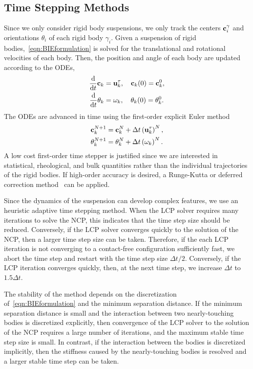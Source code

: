 \documentclass[preprint, 10pt]{elsarticle}
\begin{document}
\subsection{Time Stepping Methods}
\label{sec:temporal}
Since we only consider rigid body suspensions, we only track the centers
${\mathbf{c}}_i^\gamma$ and orientations $\theta_i$ of each rigid body
$\gamma_i$. Given a suspension of rigid
bodies,~\eqref{eqn:BIEformulation} is solved for the translational and
rotational velocities of each body. Then, the position and angle of each
body are updated according to the ODEs,
\begin{align*}
  \frac{\text{d}}{\text{d}t}{\mathbf{c}}_k &= {\mathbf{u}}^\tau_k,  
    \quad {\mathbf{c}}_k(0) = {\mathbf{c}}_k^0, \\
  \frac{\text{d}}{\text{d}t}\theta_k &= \omega_k,
    \quad \theta_k(0) = \theta_k^0.
\end{align*}
The ODEs are advanced in time using the first-order explicit Euler
method
\begin{align*}
  {\mathbf{c}}_k^{N+1} &= {\mathbf{c}}_k^N + \Delta t \left({\mathbf{u}}_k^\tau\right)^N, \\
  \theta_k^{N+1} &= \theta_k^N + \Delta t \left(\omega_k\right)^N.
\end{align*}
A low cost first-order time stepper is justified since we are interested
in statistical, rheological, and bulk quantities rather than the
individual trajectories of the rigid bodies.  If high-order accuracy is
desired, a Runge-Kutta or deferred correction method~\cite{Quaife2015,
qua-bir2016} can be applied.

Since the dynamics of the suspension can develop complex features, we
use an heuristic adaptive time stepping method.  When the LCP solver
requires many iterations to solve the NCP, this indicates that the time
step size should be reduced.  Conversely, if the LCP solver converges
quickly to the solution of the NCP, then a larger time step size can be
taken.  Therefore, if the each LCP iteration is not converging
to a contact-free configuration sufficiently fast, we abort the time
step and restart with the time step size $\Delta t/2$. Conversely, if
the LCP iteration converges quickly, then, at the next time step, we
increase $\Delta t$ to $1.5\Delta t$.

The stability of the method depends on the discretization
of~\eqref{eqn:BIEformulation} and the minimum separation distance.  If
the minimum separation distance is small and the interaction between two
nearly-touching bodies is discretized explicitly, then convergence of
the LCP solver to the solution of the NCP requires a large number of
iterations, and the maximum stable time step size is small.  In
contrast, if the interaction between the bodies is discretized
implicitly, then the stiffness caused by the nearly-touching bodies is
resolved and a larger stable time step can be taken.
\end{document}
